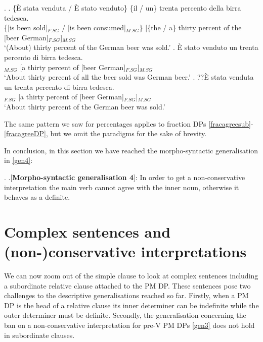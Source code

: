 \documentclass[charis, linguex]{glossa}
\begin{document}
\ex. \label{Gen} \ag.  \{È stata venduta / È stato venduto\} \{il / un\} trenta percento della birra tedesca. \\
      \{[is been sold]$_{F.SG}$ /  [is been consumed]$_{M.SG}$\}  [\{the / a\} thirty percent {of the} [beer German]$_{F.SG}$]$_{M.SG}$ \\
	\glt   `(About) thirty percent of the German beer was sold.'  \label{connn}
	\bg.  \`E stato venduto un trenta percento di birra tedesca. \\
	    [is been sold]$_{M.SG}$ [a  thirty percent of [beer German]$_{F.SG}$]$_{M.SG}$\\	 
	\glt   `About thirty percent of all the beer sold was German beer.'  \label{agreenoncon}
\cg. ??\`E stata venduta un trenta percento di birra tedesca.  \\
       [is been sold]$_{F.SG}$ [a thirty percent of [beer German]$_{F.SG}$]$_{M.SG}$ \\
	\glt   `About thirty percent of the German beer was sold.' \label{agreecon} 
	
The same pattern we saw for percentages applies to fraction DPs
\ref{fracagreesub}-\ref{fracagreeDP}, but we omit the paradigms for the sake of
brevity.

In conclusion, in this section we have reached the morpho-syntactic generalisation in \ref{gen4}:

\ex. \label{gen4} \a.[{\bf Morpho-syntactic generalisation 4}]: In order to get a non-conservative interpretation the main verb cannot agree with the inner noun, otherwise it behaves as a definite.  

\section{Complex sentences and (non-)conservative interpretations}\label{Sec-complex}

We can now zoom out of the simple clause to look at complex sentences including a subordinate relative clause attached to the PM DP. These sentences pose two challenges to the descriptive generalisations reached so far. Firstly, when a PM DP is the head of a relative clause its inner determiner can be indefinite while the outer determiner must be definite. Secondly, the generalisation concerning the ban on a non-conservative interpretation for pre-V PM DPs \ref{gen3} does not hold in subordinate clauses. 
\end{document}
